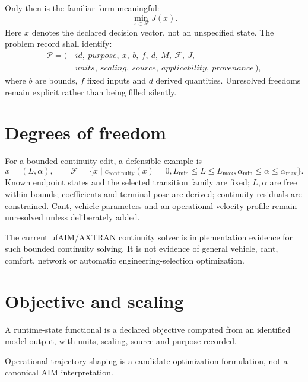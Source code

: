 Only then is the familiar form meaningful:
\[
\min_{x\in\mathcal F}J(x).
\]
Here \(x\) denotes the declared decision vector, not an unspecified state.
The problem record shall identify:
\[
\begin{aligned}
\mathcal P=(\, &id,\ purpose,\ x,\ b,\ f,\ d,\ M,\ \mathcal F,\ J,\\
              &units,\ scaling,\ source,\ applicability,\ provenance\,),
\end{aligned}
\]
where \(b\) are bounds, \(f\) fixed inputs and \(d\) derived quantities.
Unresolved freedoms remain explicit rather than being filled silently.

\section{Degrees of freedom}

For a bounded continuity edit, a defensible example is
\[
x=(L,\alpha),\qquad
\mathcal F=\{x\mid c_{\mathrm{continuity}}(x)=0,
L_{\min}\le L\le L_{\max},
\alpha_{\min}\le\alpha\le\alpha_{\max}\}.
\]
Known endpoint states and the selected transition family are fixed;
\(L,\alpha\) are free within bounds; coefficients and terminal pose are
derived; continuity residuals are constrained. Cant, vehicle parameters and
an operational velocity profile remain unresolved unless deliberately added.

The current ufAIM/AXTRAN continuity solver is implementation evidence for
such bounded continuity solving. It is not evidence of general vehicle, cant,
comfort, network or automatic engineering-selection optimization.

\section{Objective and scaling}

\begin{definition}
\label{def:runtime-state-functional}
A runtime-state functional is a declared objective computed from an identified
model output, with units, scaling, source and purpose recorded.
\end{definition}

\begin{definition}
\label{def:optimization-trajectory-shaping}
Operational trajectory shaping is a candidate optimization formulation, not a
canonical AIM interpretation.
\end{definition}

